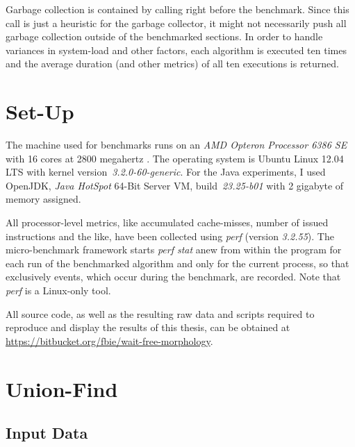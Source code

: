 Garbage collection is contained by calling  right before
the benchmark. Since this call is just a heuristic for the garbage collector, it
might not necessarily push all garbage collection outside of the benchmarked
sections. In order to handle variances in system-load and other factors, each
algorithm is executed ten times and the average duration (and other metrics) of
all ten executions is returned.

\section{Set-Up}
\label{sec:experiments-set-up}

The machine used for benchmarks runs on an \textit{AMD Opteron\texttrademark
  Processor 6386 SE} with 16 cores at 2800 megahertz
\cite{AmdOpteronSpecsWebsite}. The operating system is Ubuntu Linux 12.04 LTS
with kernel version~\textit{3.2.0-60-generic}. For the Java experiments, I used
OpenJDK, \textit{Java HotSpot\texttrademark} 64-Bit Server VM,
build~\textit{23.25-b01} with 2 gigabyte of memory assigned.

All processor-level metrics, like accumulated cache-misses, number of issued
instructions and the like, have been collected using \textit{perf}
\cite{PerfWiki} (version \emph{3.2.55}). The micro-benchmark framework starts
\emph{perf stat} anew from within the program for each run of the benchmarked
algorithm and only for the current process, so that exclusively events, which
occur during the benchmark, are recorded. Note that \emph{perf} is a Linux-only
tool.

All source code, as well as the resulting raw data and scripts required to
reproduce and display the results of this thesis, can be obtained at
\url{https://bitbucket.org/fbie/wait-free-morphology}.

\section{Union-Find}
\label{sec:experiments-union-find}

\subsection{Input Data}
\label{sec:experiments-uf-input-data}

